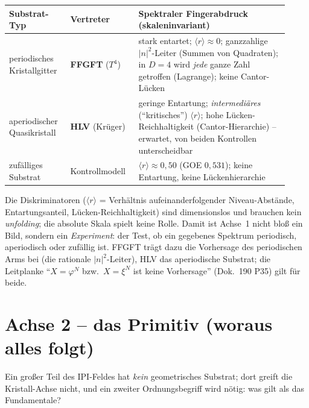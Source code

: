 \begin{center}
\small
\begin{tabular}{@{}p{0.20\linewidth}p{0.22\linewidth}p{0.50\linewidth}@{}}
\hline
\textbf{Substrat-Typ} & \textbf{Vertreter} & \textbf{Spektraler Fingerabdruck (skaleninvariant)}\\
\hline
periodisches Kristallgitter
& \textbf{FFGFT} ($T^4$)
& stark entartet; $\langle r\rangle\!\approx\!0$; ganzzahlige $|n|^2$-Leiter (Summen von Quadraten); in $D{=}4$ wird \emph{jede} ganze Zahl getroffen (Lagrange); keine Cantor-Lücken\\
aperiodischer Quasikristall
& \textbf{HLV} (Krüger)
& geringe Entartung; \emph{intermediäres} (\enquote{kritisches}) $\langle r\rangle$; hohe Lücken-Reichhaltigkeit (Cantor-Hierarchie) -- erwartet, von beiden Kontrollen unterscheidbar\\
zufälliges Substrat
& Kontrollmodell
& $\langle r\rangle\!\approx\!0{,}50$ (GOE $0{,}531$); keine Entartung, keine Lückenhierarchie\\
\hline
\end{tabular}
\end{center}

\noindent Die Diskriminatoren ($\langle r\rangle$ = Verhältnis aufeinanderfolgender
Niveau-Abstände, Entartungsanteil, Lücken-Reichhaltigkeit) sind dimensionslos und brauchen
kein \emph{unfolding}; die absolute Skala spielt keine Rolle. Damit ist Achse~1 nicht bloß
ein Bild, sondern ein \emph{Experiment}: der Test, ob ein gegebenes Spektrum periodisch,
aperiodisch oder zufällig ist. FFGFT trägt dazu die Vorhersage des periodischen Arms bei
(die rationale $|n|^2$-Leiter), HLV das aperiodische Substrat; die Leitplanke
\enquote{$X=\varphi^N$ bzw.\ $X=\xi^N$ ist keine Vorhersage} (Dok.~190 P35) gilt für beide.

\section{Achse 2 -- das Primitiv (woraus alles folgt)}

Ein großer Teil des IPI-Feldes hat \emph{kein} geometrisches Substrat; dort greift die
Kristall-Achse nicht, und ein zweiter Ordnungsbegriff wird nötig: was gilt als das
Fundamentale?

